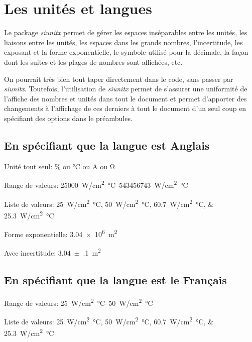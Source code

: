 \documentclass[exemple_master.tex]{subfiles}
\begin{document}
\section{Les unités et langues}

Le package \emph{siunitx} permet de gérer les espaces inséparables entre les unités, les liaisons entre les unités, les espaces dans les grands nombres, l'incertitude, les exposant et la forme exponentielle, le symbole utilisé pour la décimale, la façon dont les suites et les plages de nombres sont affichées, etc.

On pourrait très bien tout taper directement dans le code, sans passer par \emph{siunitx}. Toutefois, l'utilisation de \emph{siunitx} permet de s'assurer une uniformité de l'affiche des nombres et unités dans tout le document et permet d'apporter des changements à l'affichage de ces derniers à tout le document d'un seul coup en spécifiant des options dans le préambules.

\subsection{En spécifiant que la langue est Anglais}

Unité tout seul: \si{\percent} ou \si{\celsius} ou \si{\ampere} ou \si{\ohm}

Range de valeurs: \SIrange{25000}{543456743}{W/cm^2 \celsius}

Liste de valeurs: \SIlist{25;50;60.7;25.3}{W/cm^2 \celsius}

Forme exponentielle: \SI{3.04e6}{m^2}

Avec incertitude: \SI{3.04(10)}{m^2}

\subsection{En spécifiant que la langue est le Français}

Range de valeurs: \SIrange{25}{50}{W/cm^2 \celsius}

Liste de valeurs: \SIlist{25;50;60.7;25.3}{W/cm^2 \celsius}
\end{document}
